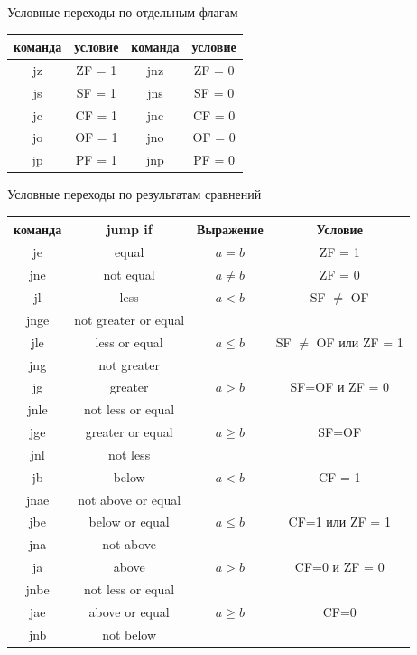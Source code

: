 \documentclass{beamer}
\begin{document}
    \begin{frame}{Условные переходы по отдельным флагам}
        \begin{table}
            \begin{tabular}{|c|c||c|c|}
                \hline команда & условие & команда & условие \\
                \hline jz & ZF = 1 & jnz & ZF = 0 \\
                \hline js & SF = 1 & jns & SF = 0 \\
                \hline jc & CF = 1 & jnc & CF = 0 \\
                \hline jo & OF = 1 & jno & OF = 0 \\
                \hline jp & PF = 1 & jnp & PF = 0 \\
                \hline
            \end{tabular}
        \end{table}
    \end{frame}
    \begin{frame}{Условные переходы по результатам сравнений}
        \begin{table}\footnotesize
            \begin{tabular}{|c|c|c|c|}
                \hline команда & jump if & Выражение & Условие \\
                \hline je & equal & $a=b$ & ZF = 1 \\
                       jne & not equal & $a \ne b$ & ZF = 0 \\
                \hline jl & less & $a < b$ & SF $\ne$ OF \\
                       jnge & not greater or equal  & & \\
                \hline jle & less or equal & $a \le b$ & SF $\ne$ OF или ZF = 1\\
                       jng & not greater & & \\
                \hline jg  & greater & $a > b$ & SF=OF и ZF = 0 \\
                       jnle & not less or equal & & \\
                \hline jge & greater or equal & $a \ge b$ & SF=OF \\
                       jnl & not less & & \\
                \hline jb & below & $a < b$ & CF = 1 \\
                       jnae & not above or equal  & & \\
                \hline jbe & below or equal & $a \le b$ & CF=1 или ZF = 1\\
                       jna & not above & & \\
                \hline ja  & above & $a > b$ & CF=0 и ZF = 0 \\
                       jnbe & not less or equal & & \\
                \hline jae & above or equal & $a \ge b$ & CF=0 \\
                       jnb & not below & & \\
                \hline
            \end{tabular}
        \end{table}
    \end{frame}
\end{document}
